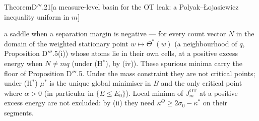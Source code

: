 \begin{thm}{Theorem}{D$'''$.21}[a measure-level basin for the OT leak: a Polyak--{\L}ojasiewicz inequality uniform
in $m$]
\begin{enumerate}[label=\textup{(\roman*)}]
    a saddle when a separation margin is negative --- for every count vector $N$ in the domain of the weighted
    stationary point $w\mapsto\Theta^*(w)$ (a neighbourhood of $q$, Proposition D$'''$.5(i)) whose atoms lie in
    their own cells, at a positive excess energy when $N\ne mq$ (under \textup{(H$^*$)}, by (iv)). These spurious
    minima carry the floor of Proposition D$'''$.5. Under the mass constraint they are not critical points; under
    \textup{(H$^*$)} $\mu^*$ is the unique global minimiser in $B$ and the only critical point where $\alpha > 0$ (in
    particular in $\{E\le E_0\}$). Local minima of $J_m^{\mathrm{OT}}$ at a positive excess energy are not excluded:
    by (ii) they need $\kappa^\Theta\ge2\sigma_0 - \kappa^*$ on their segments.
\end{enumerate}
\end{thm}

